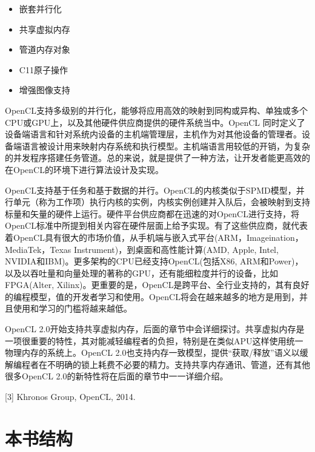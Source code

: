 \begin{itemize}
\item 嵌套并行化
\item 共享虚拟内存
\item 管道内存对象
\item C11原子操作
\item 增强图像支持
\end{itemize}

OpenCL支持多级别的并行化，能够将应用高效的映射到同构或异构、单独或多个CPU或GPU上，以及其他硬件供应商提供的硬件系统当中。OpenCL 同时定义了设备端语言和针对系统内设备的主机端管理层，主机作为对其他设备的管理者。设备端语言被设计用来映射内存系统和执行模型。主机端语言用较低的开销，为复杂的并发程序搭建任务管道。总的来说，就是提供了一种方法，让开发者能更高效的在OpenCL的环境下进行算法设计及实现。

OpenCL支持基于任务和基于数据的并行。OpenCL的内核类似于SPMD模型，并行单元（称为工作项）执行内核的实例，内核实例创建并入队后，会被映射到支持标量和矢量的硬件上运行。硬件平台供应商都在迅速的对OpenCL进行支持，将OpenCL标准中所提到相关内容在硬件层面上给予实现。有了这些供应商，就代表着OpenCL具有很大的市场价值，从手机端与嵌入式平台(ARM，Imageination，MediaTek，Texas Instrument)，到桌面和高性能计算(AMD, Apple, Intel, NVIDIA和IBM)。更多架构的CPU已经支持OpenCL(包括X86, ARM和Power)，以及以吞吐量和向量处理的著称的GPU，还有能细粒度并行的设备，比如FPGA(Alter, Xilinx)。更重要的是，OpenCL是跨平台、全行业支持的，其有良好的编程模型，值的开发者学习和使用。OpenCL将会在越来越多的地方是用到，并且使用和学习的门槛将越来越低。

OpenCL 2.0开始支持共享虚拟内存，后面的章节中会详细探讨。共享虚拟内存是一项很重要的特性，其对能减轻编程者的负担，特别是在类似APU这样使用统一物理内存的系统上。OpenCL 2.0也支持内存一致模型，提供“获取/释放”语义以缓解编程者在不明确的锁上耗费不必要的精力。支持共享内存通讯、管道，还有其他很多OpenCL 2.0的新特性将在后面的章节中一一详细介绍。

\myRefRule

\begin{myRefs}

[3] Khronos Group, OpenCL, 2014. 

\end{myRefs}



\section{本书结构}

